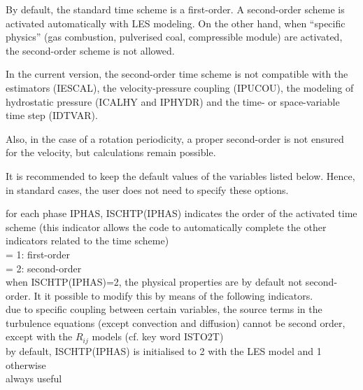 By default, the standard time scheme is a first-order.
A second-order scheme is activated automatically with LES modeling.
On the other hand, when ``specific physics'' (gas combustion, pulverised coal,
compressible module) are activated, the second-order scheme is not allowed.

In the current version, the second-order time scheme is not compatible
with the estimators (IESCAL), the velocity-pressure coupling (IPUCOU),
the modeling of hydrostatic pressure (ICALHY and IPHYDR) and the time- or
space-variable time step (IDTVAR).

Also, in the case of a rotation periodicity, a proper second-order is not
ensured for the velocity, but calculations remain possible.

It is recommended to keep the default values of the variables listed
below. Hence, in standard cases, the user does not need to specify these
options.


{for each phase IPHAS, ISCHTP(IPHAS) indicates the order of the activated
time scheme (this indicator allows the code to automatically complete
the other indicators related to the time scheme)\\
\hspace*{1.3cm}= 1: first-order \\
\hspace*{1.3cm}= 2: second-order \\
when ISCHTP(IPHAS)=2, the physical properties are by default not
second-order. It it possible to modify this by means of the
following indicators.\\
due to specific coupling between certain variables, the source terms in the
turbulence equations (except convection and diffusion) cannot be second order,
except with the $R_{ij}$ models (cf. key word ISTO2T)\\
by default, ISCHTP(IPHAS) is initialised to 2 with the LES model and 1
otherwise\\
always useful}

